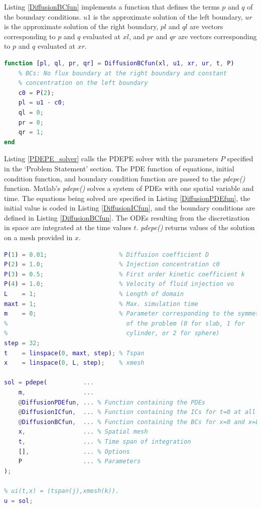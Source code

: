 \documentclass{article}
\begin{document}
Listing \ref{DiffusionBCfun} implements a function that defines the terms $p$ and $q$ of the boundary conditions. $u1$ is the approximate solution of the left boundary, $ur$ is the approximate solution of the right boundary, $pl$ and $ql$ are vectors corresponding to $p$ and $q$ evaluated at $xl$, and $pr$ and $qr$ are vectors corresponding to $p$ and $q$ evaluated at $xr$.

\begin{lstlisting}[language=Matlab, caption=Boundary condition function, label=DiffusionBCfun]
function [pl, ql, pr, qr] = DiffusionBCfun(xl, u1, xr, ur, t, P)
    % BCs: No flux boundary at the right boundary and constant
    % concentration on the left boundary
    c0 = P(2);
    pl = u1 - c0;
    ql = 0;
    pr = 0;
    qr = 1;
end
\end{lstlisting}

Listing \ref{PDEPE_solver} calls the PDEPE solver with the parameters $P$ specified in the `Problem Statement' section. The PDE function of equations, initial condition function, and boundary condition function are passed to the \emph{pdepe()} function. Matlab's \emph{pdepe()} solves a system of PDEs with one spatial variable and time. The equations being solved are specified in Listing \ref{DiffusionPDEfun}, the initial value is coded in Listing \ref{DiffusionICfun}, and the boundary conditions are defined in Listing \ref{DiffusionBCfun}. The ODEs resulting from the discretization in space are integrated at the time values $t$. \emph{pdepe()} returns values of the solution on a mesh provided in $x$. 

\begin{lstlisting}[language=Matlab, caption=PDEPE solver, label=PDEPE_solver]
% Parameters
P(1) = 0.01;                    % Diffusion coefficient D
P(2) = 1.0;                     % Injection concentration c0
P(3) = 0.5;                     % First order kinetic coefficient k
P(4) = 1.0;                     % Velocity of fluid injection vo
L    = 1;                       % Length of domain
maxt = 1;                       % Max. simulation time
m    = 0;                       % Parameter corresponding to the symmetry
%                                 of the problem (0 for slab, 1 for
%                                 cylinder, or 2 for sphere)
step = 32;
t    = linspace(0, maxt, step); % Tspan
x    = linspace(0, L, step);    % xmesh

sol = pdepe(          ...
    m,                ...
    @DiffusionPDEfun, ... % Function containing the PDEs
    @DiffusionICfun,  ... % Function containing the ICs for t=0 at all x
    @DiffusionBCfun,  ... % Function containing the BCs for x=0 and x=L
    x,                ... % Spatial mesh
    t,                ... % Time span of integration
    [],               ... % Options
    P                 ... % Parameters
);

% ui(t,x) = (tspan(j),xmesh(k)).
u = sol;
\end{lstlisting}
\end{document}
